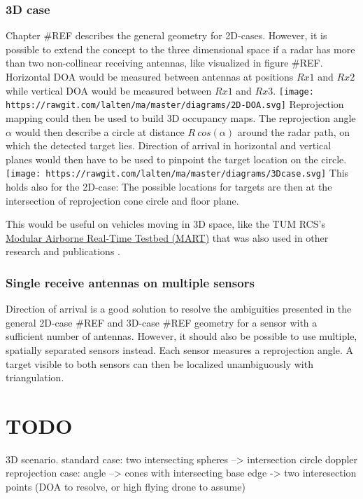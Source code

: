 \subsubsection{3D case}\label{d-case}

Chapter \#REF describes the general geometry for 2D-cases. However, it
is possible to extend the concept to the three dimensional space if a
radar has more than two non-collinear receiving antennas, like
visualized in figure \#REF. Horizontal DOA would be measured between
antennas at positions \(Rx1\) and \(Rx2\) while vertical DOA would be
measured between \(Rx1\) and \(Rx3\).
\texttt{[image: https://rawgit.com/lalten/ma/master/diagrams/2D-DOA.svg]}
Reprojection mapping could then be used to build 3D occupancy maps. The
reprojection angle \(\alpha\) would then describe a circle at distance
\(R~cos(\alpha)\) around the radar path, on which the detected target
lies. Direction of arrival in horizontal and vertical planes would then
have to be used to pinpoint the target location on the circle.
\texttt{[image: https://rawgit.com/lalten/ma/master/diagrams/3Dcase.svg]}
This holds also for the 2D-case: The possible locations for targets are
then at the intersection of reprojection cone circle and floor plane.

This would be useful on vehicles moving in 3D space, like the TUM RCS's
\href{https://www.rcs.ei.tum.de/forschung/mart/}{Modular Airborne
Real-Time Testbed (MART)} that was also used in other research and
publications \cite{Becker2015}.

\subsubsection{Single receive antennas on multiple
sensors}\label{single-receive-antennas-on-multiple-sensors}

Direction of arrival is a good solution to resolve the ambiguities
presented in the general 2D-case \#REF and 3D-case \#REF geometry for a
sensor with a sufficient number of antennas. However, it should also be
possible to use multiple, spatially separated sensors instead. Each
sensor measures a reprojection angle. A target visible to both sensors
can then be localized unambiguously with triangulation.

\section{TODO}\label{todo-3}

3D scenario. standard case: two intersecting spheres --\textgreater{}
intersection circle doppler reprojection case: angle --\textgreater{}
cones with intersecting base edge -\textgreater{} two interesection
points (DOA to resolve, or high flying drone to assume)

